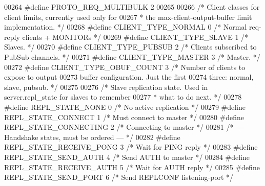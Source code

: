 \begin{DoxyCode}
{{{{{{00264 \textcolor{preprocessor}{#}\textcolor{preprocessor}{define} \textcolor{preprocessor}{PROTO\_REQ\_MULTIBULK} 2
00265 
00266 \textcolor{comment}{/* Client classes for client limits, currently used only for}
00267 \textcolor{comment}{ * the max-client-output-buffer limit implementation. */}
00268 \textcolor{preprocessor}{#}\textcolor{preprocessor}{define} \textcolor{preprocessor}{CLIENT\_TYPE\_NORMAL} 0 \textcolor{comment}{/* Normal req-reply clients + MONITORs */}
00269 \textcolor{preprocessor}{#}\textcolor{preprocessor}{define} \textcolor{preprocessor}{CLIENT\_TYPE\_SLAVE} 1  \textcolor{comment}{/* Slaves. */}
00270 \textcolor{preprocessor}{#}\textcolor{preprocessor}{define} \textcolor{preprocessor}{CLIENT\_TYPE\_PUBSUB} 2 \textcolor{comment}{/* Clients subscribed to PubSub channels. */}
00271 \textcolor{preprocessor}{#}\textcolor{preprocessor}{define} \textcolor{preprocessor}{CLIENT\_TYPE\_MASTER} 3 \textcolor{comment}{/* Master. */}
00272 \textcolor{preprocessor}{#}\textcolor{preprocessor}{define} \textcolor{preprocessor}{CLIENT\_TYPE\_OBUF\_COUNT} 3 \textcolor{comment}{/* Number of clients to expose to output}
00273 \textcolor{comment}{                                    buffer configuration. Just the first}
00274 \textcolor{comment}{                                    three: normal, slave, pubsub. */}
00275 
00276 \textcolor{comment}{/* Slave replication state. Used in server.repl\_state for slaves to remember}
00277 \textcolor{comment}{ * what to do next. */}
00278 \textcolor{preprocessor}{#}\textcolor{preprocessor}{define} \textcolor{preprocessor}{REPL\_STATE\_NONE} 0 \textcolor{comment}{/* No active replication */}
00279 \textcolor{preprocessor}{#}\textcolor{preprocessor}{define} \textcolor{preprocessor}{REPL\_STATE\_CONNECT} 1 \textcolor{comment}{/* Must connect to master */}
00280 \textcolor{preprocessor}{#}\textcolor{preprocessor}{define} \textcolor{preprocessor}{REPL\_STATE\_CONNECTING} 2 \textcolor{comment}{/* Connecting to master */}
00281 \textcolor{comment}{/* --- Handshake states, must be ordered --- */}
00282 \textcolor{preprocessor}{#}\textcolor{preprocessor}{define} \textcolor{preprocessor}{REPL\_STATE\_RECEIVE\_PONG} 3 \textcolor{comment}{/* Wait for PING reply */}
00283 \textcolor{preprocessor}{#}\textcolor{preprocessor}{define} \textcolor{preprocessor}{REPL\_STATE\_SEND\_AUTH} 4 \textcolor{comment}{/* Send AUTH to master */}
00284 \textcolor{preprocessor}{#}\textcolor{preprocessor}{define} \textcolor{preprocessor}{REPL\_STATE\_RECEIVE\_AUTH} 5 \textcolor{comment}{/* Wait for AUTH reply */}
00285 \textcolor{preprocessor}{#}\textcolor{preprocessor}{define} \textcolor{preprocessor}{REPL\_STATE\_SEND\_PORT} 6 \textcolor{comment}{/* Send REPLCONF listening-port */}
}}}}}}
\end{DoxyCode}
